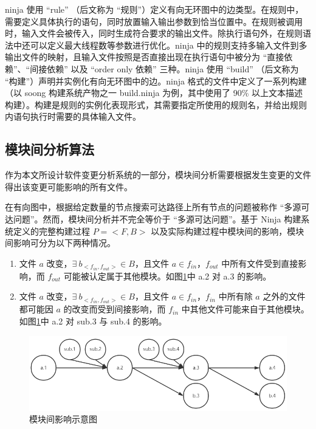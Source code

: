 ninja 使用 “rule” （后文称为 “规则”）定义有向无环图中的边类型。在规则中，需要定义具体执行的语句，同时放置输入输出参数到恰当位置中。在规则被调用时，输入文件会被传入，同时生成符合要求的输出文件。除执行语句外，在规则语法中还可以定义最大线程数等参数进行优化。ninja 中的规则支持多输入文件到多输出文件的映射，且输入文件按照是否直接出现在执行语句中被分为 “直接依赖”、“间接依赖” 以及 “order only 依赖” 三种。ninja 使用 “build” （后文称为 “构建”）声明并实例化有向无环图中的边。ninja 格式的文件中定义了一系列构建（以 soong 构建系统产物之一 build.ninja 为例，其中使用了 90\% 以上文本描述构建）。构建是规则的实例化表现形式，其需要指定所使用的规则名，并给出规则内语句执行时需要的具体输入文件。

\subsection{模块间分析算法}

作为本文所设计软件变更分析系统的一部分，模块间分析需要根据发生变更的文件得出该变更可能影响的所有文件。

在有向图中，根据给定数量的节点搜索可达路径上所有节点的问题被称作 “多源可达问题”。然而，模块间分析并不完全等价于 “多源可达问题”。基于 Ninja 构建系统定义的完整构建过程 $P = <F, B>$ 以及实际构建过程中模块间的影响，模块间影响可分为以下两种情况。

\begin{enumerate}
    \item 文件 $a$ 改变，$\exists\ b_{<f_{in}, f_{out}>} \in B$，且文件 $a \in f_{in}$，$f_{out}$ 中所有文件受到直接影响，而 $f_{out}$ 可能被认定属于其他模块。如图\ref{fig:inter-module}中 a.2 对 a.3 的影响。
    \item 文件 $a$ 改变，$\exists\ b_{<f_{in}, f_{out}>} \in B$，且文件 $a \in f_{in}$，$f_{in}$ 中所有除 $a$ 之外的文件都可能因 $a$ 的改变而受到间接影响，而 $f_{in}$ 中其他文件可能来自于其他模块。如图\ref{fig:inter-module}中 a.2 对 sub.3 与 sub.4 的影响。
\end{enumerate}

\begin{figure}
    \centering
    \includegraphics[width=.8\textwidth]{figures/inter-module.png}
    \caption{模块间影响示意图}
    \label{fig:inter-module}
\end{figure}


